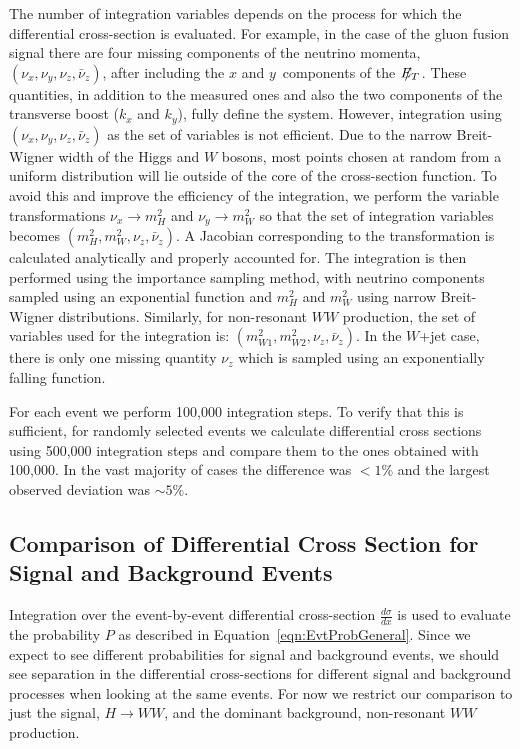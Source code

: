 \documentclass{cmspaper}
\newcommand{\met}{\mbox{$E_T\hspace{-1.1em}/$\hspace{0.7em}}}
\begin{document}
The number of integration variables depends on the process for which the differential cross-section is evaluated. For example,
in the case of the gluon fusion signal there are four missing components of the neutrino momenta,
$(\nu_{x}, \nu_{y}, \nu_{z}, \bar{\nu}_{z})$, after including the $x$ and $y$~components of the $\met$.  
These quantities, in addition to the measured ones and also the two components of the transverse boost 
($k_{x}$ and $k_{y}$), fully define the system.
However, integration using  $(\nu_{x}, \nu_{y}, \nu_{z}, \bar{\nu}_{z})$ as the set of variables is not efficient.  Due to the narrow 
Breit-Wigner width of the Higgs and $W$ bosons, most points chosen at random from a uniform distribution will lie outside of 
the core of the cross-section function. To avoid this and improve the
efficiency of the integration, we perform the variable transformations 
$\nu_{x} \rightarrow m_{H}^{2}$ and $\nu_{y} \rightarrow m_{W}^{2}$ 
so that the set of integration variables becomes $(m_{H}^{2}, m_{W}^{2}, \nu_{z}, \bar{\nu}_{z})$.
A Jacobian corresponding to the transformation is calculated analytically and properly 
accounted for. The integration is then performed using the importance sampling method, with neutrino components sampled
using an exponential function and $m_{H}^{2}$ and $m_{W}^{2}$ using narrow Breit-Wigner distributions.
Similarly, for non-resonant $WW$ production, the set of variables used for the integration is:
$(m_{W1}^{2}, m_{W2}^{2}, \nu_{z}, \bar{\nu}_{z})$. In the $W$+jet case, there is only one missing quantity $\nu_{z}$ which is sampled using 
an exponentially falling function.

For each event we perform 100,000 integration steps. To verify that this is sufficient, for randomly selected events we calculate differential cross
sections using 500,000 integration steps and compare them to the ones obtained with 100,000. In the vast majority of cases the difference
was $< 1\%$ and the largest observed deviation was $\sim 5\%$. 

\subsection{Comparison of Differential Cross Section for Signal and Background Events}

Integration over the event-by-event differential cross-section $\frac{d\sigma}{dx}$ is used to evaluate the probability $P$ as described
in Equation~\ref{eqn:EvtProbGeneral}.  Since we expect to see different probabilities for signal and background events,
we should see separation in the differential cross-sections for different signal and
background processes when looking at the same events.  For now we restrict our comparison to just the signal,
$H\rightarrow WW$, and the dominant background, non-resonant $WW$ production.
\end{document}
